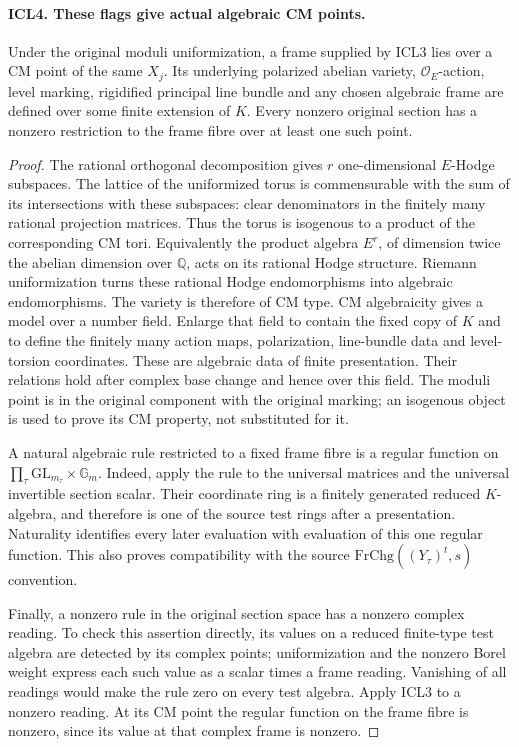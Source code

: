 \documentclass[11pt,a4paper]{article}
\numberwithin{equation}{section}
\theoremstyle{remark}\newtheorem{remark}[theorem]{Remark}
\begin{document}
\paragraph{ICL4. These flags give actual algebraic CM points.}
\label{claim:ICL4}
Under the original moduli uniformization, a frame supplied by
ICL3 lies over a CM point of the same \(X_j\).  Its underlying
polarized abelian variety, \(\mathcal O_E\)-action, level marking,
rigidified principal line bundle and any chosen algebraic frame
are defined over some finite extension of \(K\).  Every nonzero
original section has a nonzero restriction to the frame fibre
over at least one such point.
\begin{proof}
The rational orthogonal decomposition gives \(r\) one-dimensional
\(E\)-Hodge subspaces.  The lattice of the uniformized torus is
commensurable with the sum of its intersections with these
subspaces: clear denominators in the finitely many rational
projection matrices.  Thus the torus is isogenous to a product
of the corresponding CM tori.  Equivalently the product algebra
\(E^r\), of dimension twice the abelian dimension over
\(\mathbb Q\), acts on its rational Hodge structure.  Riemann
uniformization turns these rational Hodge endomorphisms into
algebraic endomorphisms.  The variety is therefore of CM type.
CM algebraicity gives a model over a number field.  Enlarge that
field to contain the fixed copy of \(K\) and to define the
finitely many action maps, polarization, line-bundle data and
level-torsion coordinates.  These are algebraic data of finite
presentation.  Their relations hold after complex base change
and hence over this field.  The moduli point is in the original
component with the original marking; an isogenous object is
used to prove its CM property, not substituted for it.

A natural algebraic rule restricted to a fixed frame fibre is a
regular function on
\(\prod_\tau\mathrm{GL}_{m_\tau}\times\mathbb G_m\).
Indeed, apply the rule to the universal matrices and the
universal invertible section scalar.  Their coordinate ring is
a finitely generated reduced \(K\)-algebra, and therefore is
one of the source test rings after a presentation.  Naturality
identifies every later evaluation with evaluation of this one
regular function.  This also proves compatibility with the
source \(\mathrm{FrChg}((Y_\tau)^t,s)\) convention.

Finally, a nonzero rule in the original section space has a
nonzero complex reading.  To check this assertion directly,
its values on a reduced finite-type test algebra are detected
by its complex points; uniformization and the nonzero Borel
weight express each such value as a scalar times a frame
reading.  Vanishing of all readings would make the rule zero
on every test algebra.  Apply ICL3 to a nonzero reading.  At its
CM point the regular function on the frame fibre is nonzero,
since its value at that complex frame is nonzero.
\end{proof}
\end{document}
